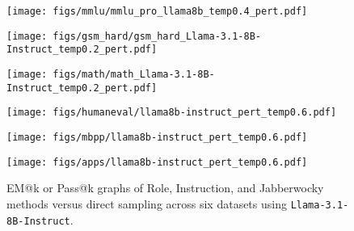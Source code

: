  \begin{figure*}[ht]
    \centering
    
    \begin{minipage}{0.32\textwidth}
        \texttt{[image: figs/mmlu/mmlu\_pro\_llama8b\_temp0.4\_pert.pdf]}
        \label{fig:pert_llama_mmlu}
    \end{minipage}
    \hfill
    \begin{minipage}{0.32\textwidth}
        \texttt{[image: figs/gsm\_hard/gsm\_hard\_Llama-3.1-8B-Instruct\_temp0.2\_pert.pdf]}
        \label{fig:pert_llama_gsm_hard}
    \end{minipage}
    \hfill
    \begin{minipage}{0.32\textwidth}
        \texttt{[image: figs/math/math\_Llama-3.1-8B-Instruct\_temp0.2\_pert.pdf]}
       \label{fig:pert_llama_math}
    \end{minipage}

    \begin{minipage}{0.32\textwidth}
        \texttt{[image: figs/humaneval/llama8b-instruct\_pert\_temp0.6.pdf]}
        \label{fig:pert_llama_humaneval}
    \end{minipage}
    \hfill
    \begin{minipage}{0.32\textwidth}
        \texttt{[image: figs/mbpp/llama8b-instruct\_pert\_temp0.6.pdf]}
        \label{fig:pert_llama_mbpp}
    \end{minipage}
    \hfill
    \begin{minipage}{0.32\textwidth}
        \texttt{[image: figs/apps/llama8b-instruct\_pert\_temp0.6.pdf]}
        \label{fig:pert_llama_apps}
    \end{minipage}
    \caption{EM@k or Pass@k graphs of Role, Instruction, and Jabberwocky methods versus direct sampling across six datasets using \texttt{Llama-3.1-8B-Instruct}.}
    \label{fig:pert_llama}
\end{figure*}